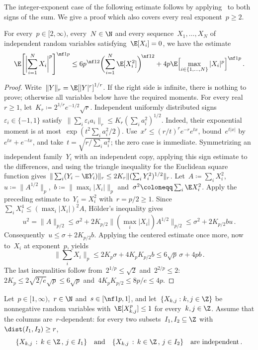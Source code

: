 \documentclass[11pt]{amsart}
\begin{document}
\smallskip

The integer-exponent case of the following estimate follows by applying~\citet[Theorem~15.11]{BLM} to both signs of the sum. We give a proof which also covers every real exponent~$p\geq2$.

\begin{lemma}
\label{l.Rosenthal}
For every~$p\in [2,\infty)$, every~$N\in\N$ and every sequence~$X_1,\ldots,X_N$ of independent random variables satisfying~$\E [ X_i ] = 0$, we have the estimate
\begin{equation*}
	\E
	\Biggl[
	\biggl|
	\sum_{i=1}^N
	X_i
	\biggr|^p
	\Biggr]^{\nf 1p}
	\leq
	6p^{\nf12}  \biggl(
	\sum_{i=1}^N
	\E [ X_i^2 ]
	\biggr)^{\!\nf12}
	+
	4p
	\E \Bigl[ \max_{i\in\{1,\ldots,N\} } |X_i| ^p \Bigr]^{\nf1p}
	\,.
\end{equation*}
\end{lemma}
\begin{proof}
Write~$\|Y\|_r=\E[|Y|^r]^{1/r}$. If the right side is infinite, there is nothing to prove; otherwise all variables below have the required moments. For every real~$r\geq1$, let~$K_r\coloneqq2^{1/r}e^{-1/2}\sqrt r$. Independent uniformly distributed signs~$\varepsilon_i\in\{-1,1\}$ satisfy~$\|\sum_i\varepsilon_i a_i\|_r\leq K_r(\sum_i a_i^2)^{1/2}$. Indeed, their exponential moment is at most~$\exp(t^2\sum_i a_i^2/2)$. Use~$x^r\leq(r/t)^r e^{-r}e^{tx}$, bound~$e^{t|x|}$ by~$e^{tx}+e^{-tx}$, and take~$t=\sqrt{r/\sum_i a_i^2}$; the zero case is immediate. Symmetrizing an independent family~$Y_i$ with an independent copy, applying this sign estimate to the differences, and using the triangle inequality for the Euclidean square function gives~$\|\sum_i(Y_i-\E Y_i)\|_r\leq2K_r\|(\sum_iY_i^2)^{1/2}\|_r$. Let~$A\coloneqq\sum_iX_i^2$,~$u\coloneqq\|A^{1/2}\|_p$,~$b\coloneqq\|\max_i|X_i|\|_p$ and~$\sigma^2\coloneqq\sum_i\E X_i^2$. Apply the preceding estimate to~$Y_i=X_i^2$ with~$r=p/2\geq1$. Since~$\sum_iX_i^4\leq(\max_i|X_i|)^2A$, H\"older's inequality gives
\begin{equation*}
	u^2=\|A\|_{p/2}
	\leq\sigma^2+2K_{p/2}\|(\max_i|X_i|)A^{1/2}\|_{p/2}
	\leq\sigma^2+2K_{p/2}bu\,.
\end{equation*}
Consequently~$u\leq\sigma+2K_{p/2}b$. Applying the centered estimate once more, now to~$X_i$ at exponent~$p$, yields
\begin{equation*}
	\Big\|\sum_iX_i\Big\|_p
	\leq2K_p\sigma+4K_pK_{p/2}b
	\leq6\sqrt p\,\sigma+4p b\,.
\end{equation*}
The last inequalities follow from~$2^{1/p}\leq\sqrt2$ and~$2^{2/p}\leq2$:~$2K_p\leq2\sqrt{2/e}\sqrt p\leq6\sqrt p$ and~$4K_pK_{p/2}\leq8p/e\leq4p$.
\end{proof}
Let~$p\in[1,\infty)$,~$r \in \N$ and~$s \in [\nf1p,1]$, and let~$\{X_{k,j}:k,j\in\Z\}$ be nonnegative random variables with~$\E[X_{k,j}^p]\leq1$ for every~$k,j\in\Z$. Assume that the columns are~$r$-dependent: for every two subsets~$I_1,I_2\subseteq\Z$ with~$\dist(I_1,I_2)\geq r$,
\begin{equation}
	\{ X_{k,j}\,:\, k \in \Z\,, \, j \in I_1 \}
	\quad \text{and} \quad
	\{ X_{k,j}\,:\, k \in \Z\,, \, j \in I_2 \}
	\quad \text{are independent}\,.
	\label{e.independent.columns.twosided}
\end{equation}
\end{document}

